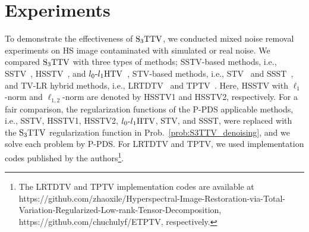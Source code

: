 \documentclass[10pt,journal]{IEEEtran}
\begin{document}

% 

\section{Experiments}
\label{sec:experiments}
To demonstrate the effectiveness of ${\text{S}_{3} \text{TTV}}$, we conducted mixed noise removal experiments on HS image contaminated with simulated or real noise.
We compared ${\text{S}_{3} \text{TTV}}$ with three types of methods; SSTV-based methods, i.e., SSTV~\cite{Aggarwal2016SSTV}, HSSTV~\cite{Takeyama2020HSSTV}, and ${l_{0}\text{-}l_{1}\text{HTV}}$~\cite{Wang2021l0l1HTV}, STV-based methods, i.e., STV~\cite{Lefkimmiatis2015STV} and SSST~\cite{Kurihara2017SSST}, and TV-LR hybrid methods, i.e., LRTDTV~\cite{Wang2018LRTDTV} and TPTV~\cite{Chen2023TPTV}.
Here, HSSTV with $\ell_{1}$-norm and $\ell_{1,2}$-norm are denoted by HSSTV1 and HSSTV2, respectively.
For a fair comparison, the regularization functions of the P-PDS applicable methods, i.e., SSTV, HSSTV1, HSSTV2, ${l_{0}\text{-}l_{1}\text{HTV}}$, STV, and SSST, were replaced with the ${\text{S}_{3} \text{TTV}}$ regularization function in Prob.~\eqref{prob:S3TTV_denoising}, and we solve each problem by P-PDS.
For LRTDTV and TPTV, we used implementation codes published by the authors\footnote{The LRTDTV and TPTV implementation codes are available at 
 \\ https://github.com/zhaoxile/Hyperspectral-Image-Restoration-via-Total-Variation-Regularized-Low-rank-Tensor-Decomposition, https://github.com/chuchulyf/ETPTV, respectively.}.
% 
% 
\end{document}
